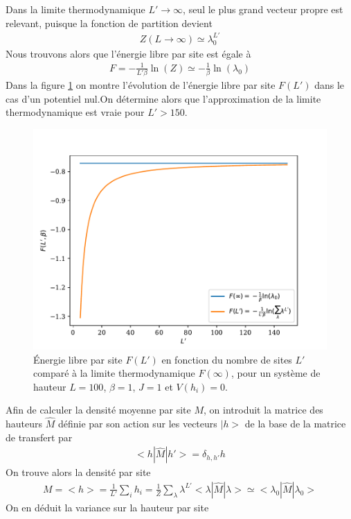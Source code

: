 Dans la limite thermodynamique $L' \to \infty$, seul le plus grand vecteur propre est relevant, puisque la fonction de partition devient
\begin{align}
    Z(L\to \infty) \simeq \lambda_0^{L'}
\end{align}
Nous trouvons alors que l'énergie libre par site est égale à 
\begin{align}
	F =  - \frac{1}{L' \beta} \ln(Z) \simeq - \frac{1}{\beta } \ln( \lambda_0)
	\label{energie-libre-site}
\end{align}
Dans la figure \ref{fig-thermo-libre} on montre l'évolution de l'énergie libre par site $F(L')$ dans le cas d'un potentiel nul.On détermine alors que l'approximation de la limite thermodynamique est vraie pour $L' \greater 150 $.
\begin{figure}
    \centering
	\includegraphics[width=0.7\linewidth]{isingtosos/freeene-thermo-libre.pdf}
	\caption{Énergie libre par site $F(L')$ en fonction du nombre de sites $L'$ comparé à la limite thermodynamique $F(\infty)$, pour un système de hauteur $L=100$, $\beta=1$, $J=1$ et $V(h_i)=0$.}
	\label{fig-thermo-libre}
	\vspace{-0.5cm}
\end{figure}  
Afin de calculer la densité moyenne par site $M$, on introduit la matrice des hauteurs $\hat{M}$ définie par son action sur les vecteurs $|h>$ de la base de la matrice de transfert par
\begin{align}
    <h|\hat{M} |h'> = \delta_{h,h'} h
\end{align}
On trouve alors la densité par site 
\begin{align}
	M = < h > = \frac{1}{L'} \sum_i h_i =  \frac{1}{Z} \sum_\lambda \lambda^{L'} < \lambda | \hat{M} | \lambda > \simeq < \lambda_0 | \hat{M} | \lambda_0 > 
	\label{tm-magnetisation}
\end{align}
On en déduit la variance sur la hauteur par site
